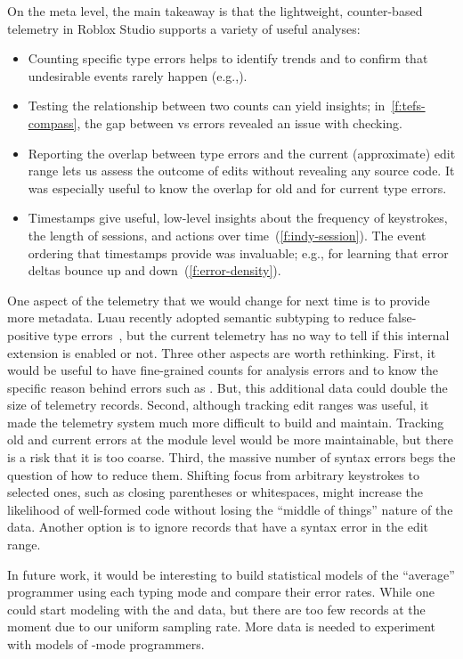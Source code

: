 \documentclass[english,submission,cleveref]{programming}
\begin{document}
On the meta level, the main takeaway is that the lightweight, counter-based telemetry
in Roblox Studio supports a variety of useful analyses:
\begin{itemize}
  \item
    Counting specific type errors helps to identify trends and to confirm that
    undesirable events rarely happen (e.g.,).
  \item
    Testing the relationship between two counts can yield insights;
    in~\cref{f:tefs-compass}, the gap between \mstrict{} vs \FS{} errors
    revealed an issue with \mstrict{} checking.
  \item
    Reporting the overlap between type errors and the current (approximate) edit
    range lets us assess the outcome of edits without revealing any source code.
    It was especially useful to know the overlap for old and for current type errors.
  \item
    Timestamps give useful, low-level insights about the frequency of keystrokes,
    the length of sessions, and actions over time~(\cref{f:indy-session}).
    The event ordering that timestamps provide was invaluable; e.g., for learning
    that error deltas bounce up and down~(\cref{f:error-density}).
\end{itemize}

One aspect of the telemetry that we would change for next time is to provide
more metadata.
Luau recently adopted semantic subtyping to reduce false-positive type
errors~\cite{luau-subt}, but the current telemetry has no way to tell if this
internal extension is enabled or not.
Three other aspects are worth rethinking.
First, it would be useful to have fine-grained counts for \FS{} analysis
errors and to know the specific reason behind errors such as .
But, this additional data could double the size of telemetry records.
Second, although tracking edit ranges was useful, it made the telemetry system
much more difficult to build and maintain.
Tracking old and current errors at the module level would be more maintainable,
but there is a risk that it is too coarse.
Third, the massive number of syntax errors begs the question of how to reduce
them.
Shifting focus from arbitrary keystrokes to selected ones, such as closing
parentheses or whitespaces, might increase the likelihood of well-formed
code without losing the ``middle of things'' nature of the data.
Another option is to ignore records that have a syntax error in the edit range.

In future work, it would be interesting to build statistical models of
the ``average'' programmer using each typing mode and compare their error
rates.
While one could start modeling with the \mnocheck{} and \mnonstrict{}
data, but there are too few \mstrict{} records at the moment due to our uniform
sampling rate.
More data is needed to experiment with models of \mstrict{}-mode programmers.
\end{document}
